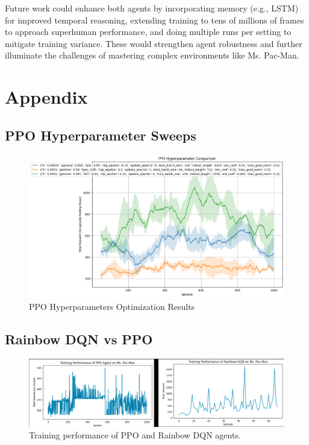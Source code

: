\documentclass{article}
\begin{document}
Future work could enhance both agents by incorporating memory (e.g., LSTM) for improved temporal reasoning, extending training to tens of millions of frames to approach superhuman performance, and doing multiple runs per setting to mitigate training variance. These would strengthen agent robustness and further illuminate the challenges of mastering complex environments like Ms. Pac-Man.

\appendix
\section{Appendix}
\label{sec:appendix}

\subsection{PPO Hyperparameter Sweeps}
\begin{figure}[htbp]
  \centering
  \includegraphics[width=\linewidth]{PPO_output_hyperparameters_3set.png}
  \caption{PPO Hyperparameters Optimization Results}
  \label{fig:ppo_hyperparams}
\end{figure}

\subsection{Rainbow DQN vs PPO}
\begin{figure}[htbp]
  \centering
  \includegraphics[width=0.85\linewidth]{rainbow_vs_ppo.png}
  \caption{Training performance of PPO and Rainbow DQN agents.}
  \label{fig:ppo_vs_rainbow}
\end{figure}
\end{document}
